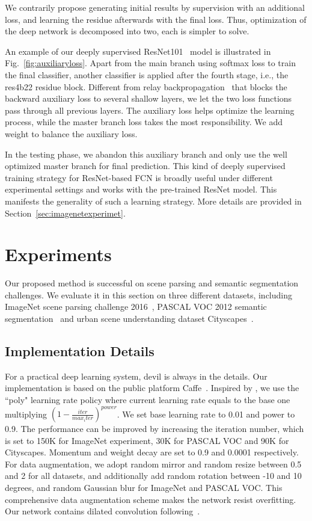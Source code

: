 \documentclass[10pt,twocolumn,letterpaper]{article}
\begin{document}
We contrarily propose generating initial results by supervision with an additional loss,
and learning the residue afterwards with the final loss. Thus, optimization of the deep
network is decomposed into two, each is simpler to solve.

An example of our deeply supervised ResNet101~\cite{he2015deep} model is illustrated in
Fig.~\ref{fig:auxiliaryloss}. Apart from the main branch using softmax loss to train the
final classifier, another classifier is applied after the fourth stage, i.e., the res4b22
residue block. Different from relay backpropagation~\cite{shen2016relay} that blocks the
backward auxiliary loss to several shallow layers, we let the two loss functions pass
through all previous layers. The auxiliary loss helps optimize the learning process,
while the master branch loss takes the most responsibility. We add weight to balance the
auxiliary loss.

In the testing phase, we abandon this auxiliary branch and only use the well optimized
master branch for final prediction. This kind of deeply supervised training strategy for
ResNet-based FCN is broadly useful under different experimental settings and works with
the pre-trained ResNet model. This manifests the generality of such a learning strategy.
More details are provided in Section~\ref{sec:imagenetexperimet}.

\section{Experiments}
Our proposed method is successful on scene parsing and semantic segmentation challenges.
We evaluate it in this section on three different datasets, including ImageNet scene
parsing challenge 2016~\cite{zhou2016semantic}, PASCAL VOC 2012 semantic
segmentation~\cite{everingham2010pascal} and urban scene understanding dataset
Cityscapes~\cite{cordts2016cityscapes}.

\subsection{Implementation Details}

For a practical deep learning system, devil is always in the details. Our implementation
is based on the public platform Caffe~\cite{jia2014caffe}. Inspired by
\cite{chen2016deeplab}, we use the ``poly" learning rate policy where current learning
rate equals to the base one multiplying $(1-\frac{iter}{max_iter})^{power}$. We set base
learning rate to 0.01 and power to 0.9. The performance can be improved by increasing the
iteration number, which is set to 150K for ImageNet experiment, 30K for PASCAL VOC and
90K for Cityscapes. Momentum and weight decay are set to 0.9 and 0.0001 respectively. For
data augmentation, we adopt random mirror and random resize between 0.5 and 2 for all
datasets, and additionally add random rotation between -10 and 10 degrees, and random
Gaussian blur for ImageNet and PASCAL VOC. This comprehensive data augmentation scheme
makes the network resist overfitting. Our network contains dilated convolution
following~\cite{chen2016deeplab}.
\end{document}
